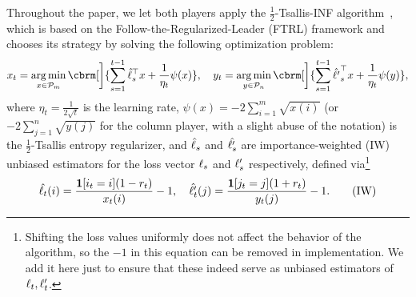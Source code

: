Throughout the paper, we let both players apply the $\frac{1}{2}$-Tsallis-INF algorithm~\citep{zimmert2021tsallis},
which is based on the Follow-the-Regularized-Leader (FTRL) framework and chooses its strategy by solving the following optimization problem:
\begin{align}
    \label{eq:Tsallis-INF}
    x_t
    =
    \argmin_{x \in \cP_m}
    \cbrm[\bigg]{
    \sum_{s=1}^{t-1}
    \hat{\lr}_s^\top x
    +
    \frac{1}{\eta_t}
    \psi(x)
    },
    \quad
    y_t
    =
    \argmin_{y \in \cP_n}
    \cbrm[\bigg]{
    \sum_{s=1}^{t-1}
    \hat{\lc}_s^\top x
    +
    \frac{1}{\eta_t}
    \psi(y)
    },
\end{align}
where $\eta_t = \frac{1}{2 \sqrt{t}}$ is the learning rate, $\psi(x) = - 2 \sum_{i =1}^m \sqrt{x(i)}$ (or $- 2 \sum_{j =1}^n \sqrt{y(j)}$ for the column player, with a slight abuse of the notation) is the $\frac{1}{2}$-Tsallis entropy regularizer, and $\hat{\ell}_s$ and $\hat{\ell'_s}$ are importance-weighted (IW) unbiased estimators for the loss vector $\ell_s$ and $\ell'_s$ respectively, defined via\footnote{
    Shifting the loss values uniformly does not affect the behavior of the algorithm, so the \(-1\) in this equation can be removed in implementation.
    We add it here just to ensure that these indeed serve as unbiased estimators of \(\ell_t, \ell'_t\).
}
\begin{equation}
\begin{aligned}
    \hat{\ell_t}(i)=\frac{\operatorname{\boldsymbol{1}}[i_t=i](1 - r_t)}{x_t(i)} - 1, 
    \quad
    \hat{\ell'_t}(j)=
    \frac{\operatorname{\boldsymbol{1}}[j_t=j] (1 + r_t)}{y_t(j)} - 1.
\end{aligned}
    \tag{IW}\label{eq:defIW}
\end{equation}


